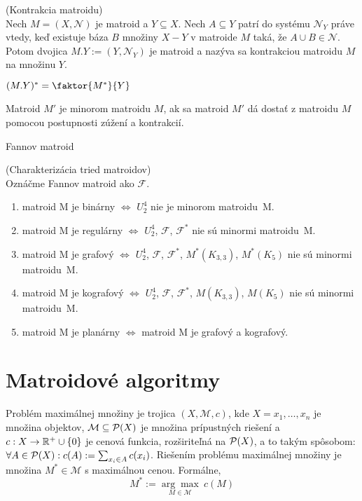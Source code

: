 \begin{definition}{(Kontrakcia matroidu)}\\
Nech $M = (X, \mathcal{N})$ je matroid a $Y \subseteq X$. 
Nech $A \subseteq Y$ patrí do systému $\mathcal{N}_Y$ práve vtedy, keď existuje 
báza $B$ množiny $X-Y$ v matroide $M$ taká, že $A \cup B \in \mathcal{N}$. Potom dvojica
$M.Y := (Y, \mathcal{N}_Y)$ je matroid a nazýva sa kontrakciou matroidu $M$ na množinu $Y$.
\end{definition}

\begin{theorem}
$(M.Y)^* = \faktor{M^*}{Y}$
\end{theorem}

\begin{definition}
Matroid $M'$ je minorom matroidu $M$, ak sa matroid $M'$ dá dostať z matroidu $M$ pomocou postupnosti zúžení a kontrakcií.
\end{definition}

\TODO Fannov matroid

\begin{theorem_hard}{(Charakterizácia tried matroidov)}\\

Oznáčme Fannov matroid ako $\mathcal{F}$.

\begin{enumerate}
    \item matroid M je binárny $\Longleftrightarrow$ $U_2^4$ nie je minorom matroidu~M.
    \item matroid M je regulárny $\Longleftrightarrow$ $U_2^4$, $\mathcal{F}$, $\mathcal{F}^*$ nie sú minormi matroidu~M.
    \item matroid M je grafový $\Longleftrightarrow$ $U_2^4$, $\mathcal{F}$, $\mathcal{F}^*$, $M^*(K_{3,3})$, $M^*(K_{5})$ nie sú minormi matroidu~M.
    \item matroid M je kografový $\Longleftrightarrow$ $U_2^4$, $\mathcal{F}$, $\mathcal{F}^*$, $M(K_{3,3})$, $M(K_{5})$ nie sú minormi matroidu~M.
    \item matroid M je planárny $\Longleftrightarrow$ matroid M je grafový a kografový.
\end{enumerate}
\end{theorem_hard}


\section{Matroidové algoritmy}

\begin{definition}

Problém maximálnej množiny je trojica $(X, \mathcal{M}, c)$, kde 
$X = {x_1, \ldots, x_n}$ je množina objektov, 
$\mathcal{M} \subseteq \mathcal{P}(X)$ je množina prípustných riešení a $c: X \to \mathbb{R}^+ \cup \left\{0\right\}$
je cenová funkcia, rozširiteľná na $\mathcal{P}(X)$, a to takým spôsobom: $\forall A \in \mathcal{P}(X): c(A) := \sum_{x_i \in A} c(x_i) $.
Riešením problému maximálnej množiny je množina $M^* \in \mathcal{M}$ s maximálnou cenou. Formálne,
$$M^* := \underset{M \in \mathcal{M}}{\arg\max}~c(M)$$

\end{definition}

